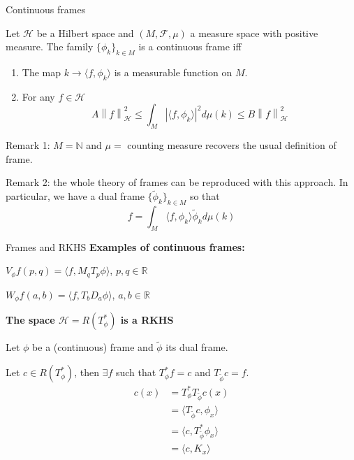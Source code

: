 \documentclass[10pt]{beamer}
\theoremstyle{definition} %
\newcommand{\norm}[1]{\left\lVert#1\right\rVert}
\begin{document}
\begin{frame}{Continuous frames}
    
\begin{definition}
Let $\mathcal{H}$ be a Hilbert space and $(M, \mathcal{F}, \mu)$ a measure space with positive measure. The family $\{\phi_k\}_{k \in M }$ is a continuous frame iff
\begin{enumerate}
    \item The map $k \to \langle f, \phi _k \rangle$ is a measurable function on $M$.
    \item For any $f \in \mathcal{H}$
    $$ A \norm{f}^2_\mathcal{H} \leq \int_M |\langle f, \phi_k \rangle|^2 d\mu(k) \leq B \norm{f}^2_\mathcal{H}$$
\end{enumerate}
\end{definition}
Remark 1: $M=\mathbb{N}$ and $\mu=$ counting measure recovers the usual definition of frame.

Remark 2: the whole theory of frames can be reproduced with this approach. In particular, we have a dual frame $\{\widetilde\phi_k\}_{k \in M }$ so that 
$$ f = \int_M \langle f, \phi_k \rangle \widetilde\phi_k d\mu(k) $$
\end{frame}

\begin{frame}{Frames and RKHS}
\textbf{Examples of continuous frames: }

$V_\phi f(p,q) = \langle f, M_q T_p \phi \rangle$, $p,q \in \mathbb{R}$

$W_\phi f(a,b) = \langle f, T_b D_a \phi \rangle$, $a,b \in \mathbb{R}$

    \textbf{The space $\mathcal{H} = R(T^*_\phi) 
    $ %
     is a RKHS}
    
    
    
    Let $\phi$ be a (continuous) frame and $\widetilde{\phi}$ its dual frame. 
    

    Let $c \in R(T^*_\phi)$, then $\exists f$ such that $T^*_\phi f = c$ and $T_{\widetilde{\phi}} c = f$. 
    \vspace{-1em}
    \[ 
    \begin{split}
        c(x)& = T^*_\phi T_{\widetilde{\phi}} c(x) \\
        & = \langle T_{\widetilde{\phi}} c, \phi_x \rangle \\ 
        & = \langle c, T_{\widetilde{\phi}}^* \phi_x \rangle \\ 
        & = \langle c, K_x \rangle
    \end{split}
    \]\vspace{-1em}

\end{frame}
\end{document}
